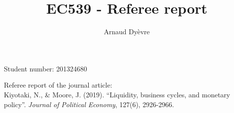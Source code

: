 \documentclass{amsart}
\theoremstyle{definition}
\theoremstyle{remark}
\numberwithin{equation}{section}
\begin{document}
\title{EC539 - Referee report}

\author{Arnaud Dy\`evre}







\maketitle

\begin{center}
Student number: 201324680
\end{center}


\vspace{12pt}

Referee report of the journal article: \\ 
Kiyotaki, N., \& Moore, J. (2019). ``Liquidity, business cycles, and monetary policy''. \textit{Journal of Political Economy}, 127(6), 2926-2966.

\newpage 
\end{document}
